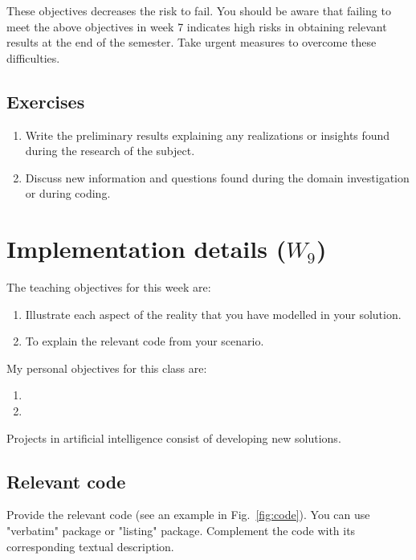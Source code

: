 \documentclass[a4paper,12pt]{report}
\begin{document}
These objectives decreases the risk to fail. 
You should be aware that failing to meet the above objectives in week 
7 indicates high risks in obtaining relevant results at the end of the semester.
Take urgent measures to overcome these difficulties.


\section{Exercises}
\begin{enumerate}
\item Write the preliminary results explaining any realizations or insights found during the research of the subject.
\item Discuss new information and questions found during the domain investigation or during coding.
\end{enumerate}








\chapter{Implementation details ($W_9$)}

The teaching objectives for this week are:
\begin{enumerate}
 \item Illustrate each aspect of the reality that you have 
 modelled in your solution.
\item To explain the relevant code from your scenario.
\end{enumerate}

\vspace{0.5cm}

My personal objectives for this class are:
\begin{enumerate}
 \item 
 \item 
\end{enumerate}

Projects in artificial intelligence consist of developing new solutions. 


\section{Relevant code}

Provide the relevant code (see an example in Fig.~\ref{fig:code}).
You can use "verbatim" package or "listing" package. 
Complement the code with its corresponding textual description.
\end{document}
